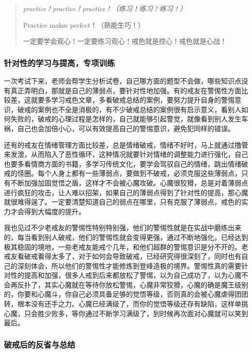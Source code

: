 \begin{quotation}\it
    practice！practice！practice！（练习！练习！练习！）

    Practice makes perfect！（熟能生巧！）

    一定要学会观心！一定要练习观心！戒色就是控心！戒色就是心战！
\end{quotation}

\subsubsection{针对性的学习与提高，专项训练}

一次考试下来，老师会帮学生分析试卷，自己哪方面的题型不会做，哪些知识点没有真正弄明白，那就是自己的薄弱点，要针对性地加强。有的戒友在警惕性方面比较差，这就要多学习戒色文章，多看破戒总结的案例，要努力提升自身的警惕意识，破戒的案例也不全是消极的，有不少破戒总结的案例很有启示意义，看别人如何失败的，破戒的心理过程是怎样的，自己就能够引起警觉，就像看到别人发生车祸，自己也会加倍小心，可以有效提高自己的警惕意识，避免犯同样的错误。

还有的戒友在情绪管理方面比较差，总是情绪破戒，情绪不好时，马上就通过撸管来发泄，从而陷入了恶性循环，这种情况就要针对情绪的调整能力进行强化，自己也要多看情商方面的书籍，多学习传统文化，要学会驾驭自己的情绪，跳出情绪破戒的怪圈。每个人身上都有一些薄弱点，要做到不破戒，必须克服这些薄弱点，只有不断加强加固觉悟之盾，这样才不会被心魔攻破。心魔很狡猾，总是对着薄弱点进行疯狂的攻击，让人难以招架，如果自己的薄弱点得到了针对性的提高，那心魔就很难得逞了。一定要清楚知道自己的弱点在哪里，只有克服了薄弱点，戒色的实力才会得到大幅度的提升。

我也见过不少老戒友的警惕性特别特别强，他们的警惕性就是在实战中磨练出来的，每当看到别人破戒，他们的警惕性就会变得更强，通过不断地强化，已经达到极其稳固的境地，一些老戒友能戒个几年，和他们超群的警惕意识是分不开的。老戒友看破戒看得太多了，对于如何会导致破戒，已经研究得很深刻了，同时也有自己的深刻体会，所以他们的警惕性才能修炼到登峰造极的境界。警惕性真的需要针对性的提高和加强，很多人戒到后来都放松了警惕，以为自己成功了，以为心魔不会再反扑了，其实心魔就在等待你放松警惕，心魔非常狡猾，心魔的确是魔王级别的，你要和心魔斗，你自己必须具备足够的觉悟等级，否则真的会被心魔虐得团团转，根本没有还手之力。心魔已经满级了，而你的觉悟等级还存有缺陷，这样单挑心魔，只会胜少败多，等你通过不断学习满级了，到时候再次面对心魔就可以笑到最后。

\subsubsection{破戒后的反省与总结}

